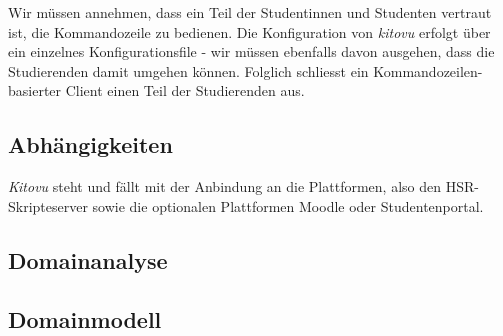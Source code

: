 \documentclass[a4paper]{article}
\let\oldsection\section
\renewcommand\section{\clearpage\oldsection}
\begin{document}
Wir müssen annehmen, dass ein Teil der Studentinnen und Studenten vertraut ist, die Kommandozeile zu bedienen. Die Konfiguration von \emph{kitovu} erfolgt über ein einzelnes Konfigurationsfile - wir müssen ebenfalls davon ausgehen, dass die Studierenden damit umgehen können. Folglich schliesst ein Kommandozeilen-basierter Client einen Teil der Studierenden aus.

\subsection{Abhängigkeiten}
\emph{Kitovu} steht und fällt mit der Anbindung an die Plattformen, also den HSR-Skripteserver sowie die optionalen Plattformen Moodle oder Studentenportal.


\pagebreak
\begin{landscape}
  \thispagestyle{empty}
  \section{Domainanalyse}
  \subsection{Domainmodell}
  
\end{landscape}
\end{document}
